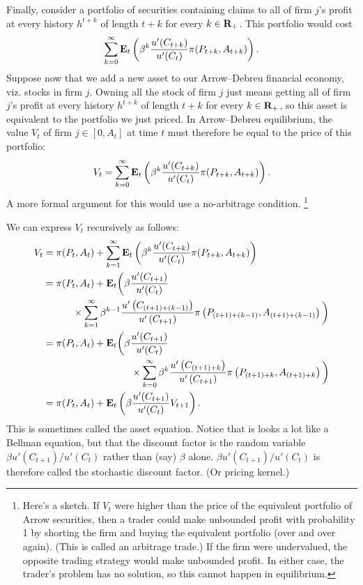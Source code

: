 \documentclass[11pt,letterpaper,reqno,oneside]{article}
\begin{document}
Finally, consider a portfolio of securities containing claims to all of firm $j$'s profit at every history $h^{t+k}$ of length $t+k$ for every $k \in \mathbf{R}_+$. This portfolio would cost
%
\begin{equation*}
	\sum_{k=0}^\infty
	\mathbf{E}_t \left(
	\beta^k \frac{ u'(C_{t+k}) }{ u'(C_t) } 
	\pi( P_{t+k}, A_{t+k} )
	\right) .
\end{equation*}
%
Suppose now that we add a new asset to our Arrow--Debreu financial economy, viz. stocks in firm $j$. Owning all the stock of firm $j$ just means getting all of firm $j$'s profit at every history $h^{t+k}$ of length $t+k$ for every $k \in \mathbf{R}_+$, so this asset is equivalent to the portfolio we just priced. In Arrow--Debreu equilibrium, the value $V_t$ of firm $j \in [0,A_t]$ at time $t$ must therefore be equal to the price of this portfolio:
%
\begin{equation*}
	V_t 
	= \sum_{k=0}^\infty
	\mathbf{E}_t \left(
	\beta^k \frac{ u'(C_{t+k}) }{ u'(C_t) } 
	\pi( P_{t+k}, A_{t+k} )
	\right) .
\end{equation*}
%
A more formal argument for this would use a no-arbitrage condition.%
	\footnote{Here's a sketch. If $V_t$ were higher than the price of the equivalent portfolio of Arrow securities, then a trader could make unbounded profit with probability 1 by shorting the firm and buying the equivalent portfolio (over and over again). (This is called an arbitrage trade.) If the firm were undervalued, the opposite trading strategy would make unbounded profit. In either case, the trader's problem has no solution, so this cannot happen in equilibrium.}


We can express $V_t$ recursively as follows:
%
\begin{align*}
	V_t 
	&= \pi( P_t, A_t )
	+ \sum_{k=1}^\infty
	\mathbf{E}_t \left(
	\beta^k \frac{ u'(C_{t+k}) }{ u'(C_t) } 
	\pi( P_{t+k}, A_{t+k} )
	\right)
	\\
	&= \pi( P_t, A_t )
	+ 
	\mathbf{E}_t \bigg(
	\beta \frac{ u'(C_{t+1}) }{ u'(C_t) } 
	\\
	&\quad\quad\quad\times
	\sum_{k=1}^\infty
	\beta^{k-1} 
	\frac{ u'\left(C_{(t+1)+(k-1)}\right) }
	{ u'\left(C_{t+1}\right) } 
	\pi\left( P_{(t+1)+(k-1)}, A_{(t+1)+(k-1)} \right)
	\bigg)
	\\
	&= \pi( P_t, A_t )
	+ 
	\mathbf{E}_t \bigg(
	\beta \frac{ u'(C_{t+1}) }{ u'(C_t) } 
	\\
	&\quad\quad\quad\quad\quad\quad\quad\quad\quad\times
	\sum_{k=0}^\infty
	\beta^{k} 
	\frac{ u'\left(C_{(t+1)+k}\right) }
	{ u'\left(C_{t+1}\right) } 
	\pi\left( P_{(t+1)+k}, A_{(t+1)+k} \right)
	\bigg)
	\\
	&= \pi( P_t, A_t )
	+ 
	\mathbf{E}_t \left(
	\beta \frac{ u'(C_{t+1}) }{ u'(C_t) } V_{t+1} \right) .
\end{align*}
%
This is sometimes called the asset equation. Notice that is looks a lot like a Bellman equation, but that the discount factor is the random variable $\beta u'(C_{t+1}) / u'(C_t)$ rather than (say) $\beta$ alone. $\beta u'(C_{t+1}) / u'(C_t)$ is therefore called the stochastic discount factor. (Or pricing kernel.)
\end{document}
